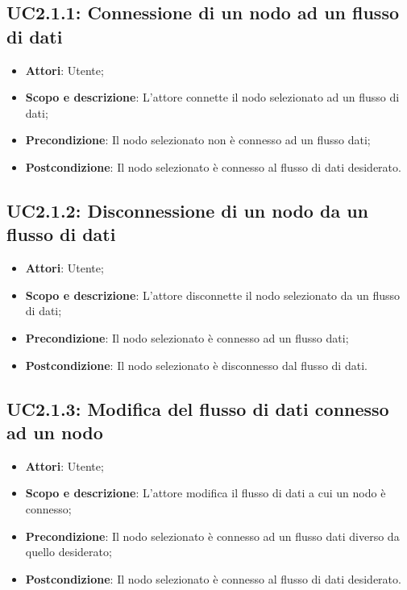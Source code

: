 \subsection{UC2.1.1: Connessione di un nodo ad un flusso di dati}
\hypertarget{UC2.1.1}{}
\begin{itemize}
	\item \textbf{Attori}: Utente;
	\item \textbf{Scopo e descrizione}: L'attore connette il nodo selezionato ad un flusso di dati;
	\item \textbf{Precondizione}: Il nodo selezionato non è connesso ad un flusso dati;
	\item \textbf{Postcondizione}: Il nodo selezionato è connesso al flusso di dati desiderato.
\end{itemize}

\subsection{UC2.1.2: Disconnessione di un nodo da un flusso di dati}
\hypertarget{UC2.1.2}{}
\begin{itemize}
	\item \textbf{Attori}: Utente;
	\item \textbf{Scopo e descrizione}: L'attore disconnette il nodo selezionato da un flusso di dati;
	\item \textbf{Precondizione}: Il nodo selezionato è connesso ad un flusso dati;
	\item \textbf{Postcondizione}: Il nodo selezionato è disconnesso dal flusso di dati.
\end{itemize}

\subsection{UC2.1.3: Modifica del flusso di dati connesso ad un nodo}
\hypertarget{UC2.1.3}{}
\begin{itemize}
	\item \textbf{Attori}: Utente;
	\item \textbf{Scopo e descrizione}: L'attore modifica il flusso di dati a cui un nodo è connesso;
	\item \textbf{Precondizione}: Il nodo selezionato è connesso ad un flusso dati diverso da quello desiderato;
	\item \textbf{Postcondizione}: Il nodo selezionato è connesso al flusso di dati desiderato.
\end{itemize}
